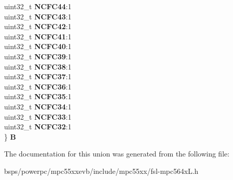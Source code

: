\begin{DoxyCompactItemize}
\begin{tabbing}
\>uint32\_t {\bfseries NCFC44}:1\\
\>uint32\_t {\bfseries NCFC43}:1\\
\>uint32\_t {\bfseries NCFC42}:1\\
\>uint32\_t {\bfseries NCFC41}:1\\
\>uint32\_t {\bfseries NCFC40}:1\\
\>uint32\_t {\bfseries NCFC39}:1\\
\>uint32\_t {\bfseries NCFC38}:1\\
\>uint32\_t {\bfseries NCFC37}:1\\
\>uint32\_t {\bfseries NCFC36}:1\\
\>uint32\_t {\bfseries NCFC35}:1\\
\>uint32\_t {\bfseries NCFC34}:1\\
\>uint32\_t {\bfseries NCFC33}:1\\
\>uint32\_t {\bfseries NCFC32}:1\\
\} {\bfseries B}\\

\end{tabbing}\end{DoxyCompactItemize}


The documentation for this union was generated from the following file\+:\begin{DoxyCompactItemize}
\item 
bsps/powerpc/mpc55xxevb/include/mpc55xx/fsl-\/mpc564x\+L.\+h\end{DoxyCompactItemize}
